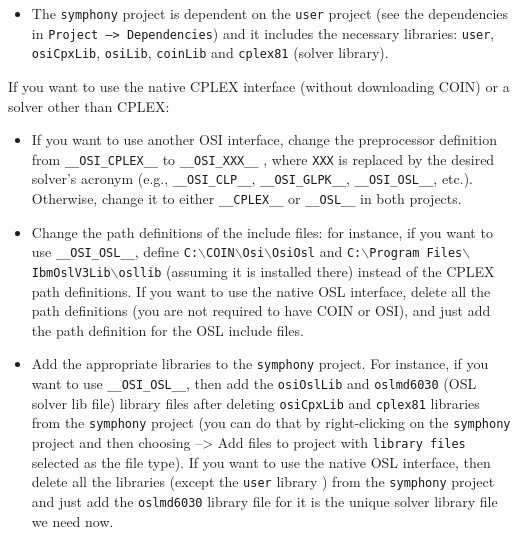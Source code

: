 \begin{itemize}
\begin{itemize}
\item The \texttt{symphony} project is dependent on the \texttt{user} project
(see the dependencies in \texttt{Project --> Dependencies}) and it includes the
necessary libraries: \texttt{user}, \texttt{osiCpxLib}, \texttt{osiLib},
\texttt{coinLib} and \texttt{cplex81} (solver library).

\end{itemize}

If you want to use the native CPLEX interface (without downloading COIN) or a
solver other than CPLEX:

\begin{itemize}

\item If you want to use another OSI interface, change the preprocessor
definition from \texttt{\_\_OSI\_CPLEX\_\_} to \texttt{\_\_OSI\_XXX\_\_} ,
where \texttt{XXX} is replaced by the desired solver's acronym (e.g.,
\texttt{\_\_OSI\_CLP\_\_}, \texttt{\_\_OSI\_GLPK\_\_},
\texttt{\_\_OSI\_OSL\_\_}, etc.). Otherwise, change it to either
\texttt{\_\_CPLEX\_\_} or \texttt{\_\_OSL\_\_} in both projects.

\item Change the path definitions of the include files: for instance, if you want
to use \texttt{\_\_OSI\_OSL\_\_}, define
\texttt{C:$\backslash$COIN$\backslash$Osi$\backslash$OsiOsl} and \texttt{C:$\backslash$Program
Files$\backslash$IbmOslV3Lib$\backslash$osllib} (assuming it is installed
there) instead of the CPLEX path definitions. If you want to use the native
OSL interface, delete all the path definitions (you are not required to have
COIN or OSI), and just add the path definition for the OSL include files.

\item Add the appropriate libraries to the \texttt{symphony} project. For
instance, if you want to use \texttt{\_\_OSI\_OSL\_\_}, then add the
\texttt{osiOslLib} and \texttt{oslmd6030} (OSL solver lib file) library files
after deleting \texttt{osiCpxLib} and \texttt{cplex81} libraries from the
\texttt{symphony} project (you can do that by right-clicking on the
\texttt{symphony} project and then choosing --> Add files to project with
\texttt{library files} selected as the file type). If 
you want to use the native OSL interface, then delete all the libraries
(except the \texttt{user} library ) from the \texttt{symphony} project and
just add the \texttt{oslmd6030} library file for it is the unique solver
library file we need now.


\end{itemize}
\end{itemize}
